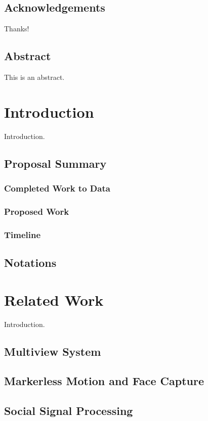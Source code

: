 \documentclass[oneside,letterpaper]{memoir}
\begin{document}
\frontmatter

\thetitlepage
\copyrightpage

\section*{Acknowledgements}
Thanks!

\newpage
\section*{Abstract}

This is an abstract.

\newpage
\tableofcontents
\listoffigures
\listoftables

\mainmatter

\chapter{Introduction}
Introduction.
\section{Proposal Summary}
\subsection{Completed Work to Data}
\subsection{Proposed Work}
\subsection{Timeline}
\section{Notations}


\chapter{Related Work}
Introduction.
\section{Multiview System}
\section{Markerless Motion and Face Capture}
\section{Social Signal Processing}
\end{document}
